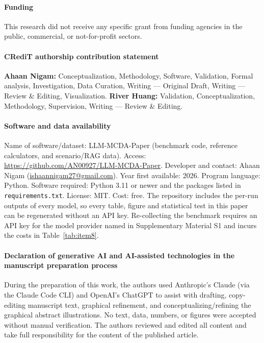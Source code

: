 \documentclass[final,3p,times]{elsarticle}
\begin{document}
\paragraph*{Funding}
This research did not receive any specific grant from funding agencies in the public, commercial, or not-for-profit sectors.

\paragraph*{CRediT authorship contribution statement}
\textbf{Ahaan Nigam:} Conceptualization, Methodology, Software, Validation, Formal analysis, Investigation, Data Curation, Writing --- Original Draft, Writing --- Review \& Editing, Visualization. \textbf{River Huang:} Validation, Conceptualization, Methodology, Supervision, Writing --- Review \& Editing.

\paragraph*{Software and data availability}
Name of software/dataset: LLM-MCDA-Paper (benchmark code, reference calculators, and scenario/RAG data). Access: \url{https://github.com/AN00927/LLM-MCDA-Paper}.
Developer and contact: Ahaan Nigam (\href{mailto:ishaannigam27@gmail.com}{ishaannigam27@gmail.com}). 
Year first available: 2026. 
Program language: Python.
Software required: Python 3.11 or newer and the packages listed in \texttt{requirements.txt}.
License: MIT. Cost: free.
The repository includes the per-run outputs of every model, so every table, figure and statistical test in this paper can be regenerated without an API key. Re-collecting the benchmark requires an API key for the model provider named in Supplementary Material S1 and incurs the costs in Table~\ref{tab:item8}.

\paragraph*{Declaration of generative AI and AI-assisted technologies in the manuscript preparation process}
During the preparation of this work, the authors used Anthropic's Claude (via the Claude Code CLI) and OpenAI's ChatGPT to assist with drafting, copy-editing manuscript text, graphical refinement, and conceptualizing/refining the graphical abstract illustrations. No text, data, numbers, or figures were accepted without manual verification. The authors reviewed and edited all content and take full responsibility for the content of the published article.
\end{document}
